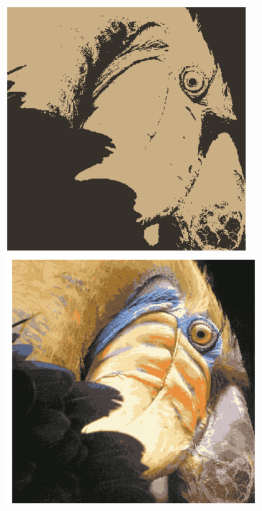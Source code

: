 \documentclass[a4paper,parskip=full-]{article}
\begin{document}
\begin{minipage}[c]{\textwidth}
\centering
	\includegraphics[scale=0.5]{vogel2farben.png}
	\includegraphics[scale=0.5]{vogel16farben.png}
\end{minipage}
\end{document}

